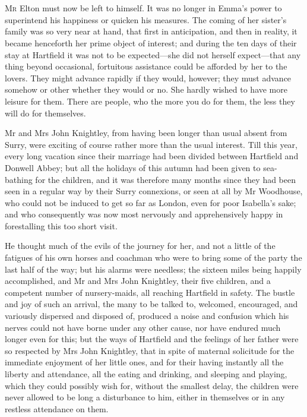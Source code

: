 \chapter[Chapter \thechapter]{}
\lettrine[lraise=0.3]{M}{r} Elton must now be left to himself. It was no longer in Emma's power to superintend his happiness or quicken his measures. The coming of her sister's family was so very near at hand, that first in anticipation, and then in reality, it became henceforth her prime object of interest; and during the ten days of their stay at Hartfield it was not to be expected—she did not herself expect—that any thing beyond occasional, fortuitous assistance could be afforded by her to the lovers. They might advance rapidly if they would, however; they must advance somehow or other whether they would or no. She hardly wished to have more leisure for them. There are people, who the more you do for them, the less they will do for themselves.

Mr and Mrs John Knightley, from having been longer than usual absent from Surry, were exciting of course rather more than the usual interest. Till this year, every long vacation since their marriage had been divided between Hartfield and Donwell Abbey; but all the holidays of this autumn had been given to sea-bathing for the children, and it was therefore many months since they had been seen in a regular way by their Surry connexions, or seen at all by Mr Woodhouse, who could not be induced to get so far as London, even for poor Isabella's sake; and who consequently was now most nervously and apprehensively happy in forestalling this too short visit.

He thought much of the evils of the journey for her, and not a little of the fatigues of his own horses and coachman who were to bring some of the party the last half of the way; but his alarms were needless; the sixteen miles being happily accomplished, and Mr and Mrs John Knightley, their five children, and a competent number of nursery-maids, all reaching Hartfield in safety. The bustle and joy of such an arrival, the many to be talked to, welcomed, encouraged, and variously dispersed and disposed of, produced a noise and confusion which his nerves could not have borne under any other cause, nor have endured much longer even for this; but the ways of Hartfield and the feelings of her father were so respected by Mrs John Knightley, that in spite of maternal solicitude for the immediate enjoyment of her little ones, and for their having instantly all the liberty and attendance, all the eating and drinking, and sleeping and playing, which they could possibly wish for, without the smallest delay, the children were never allowed to be long a disturbance to him, either in themselves or in any restless attendance on them.

